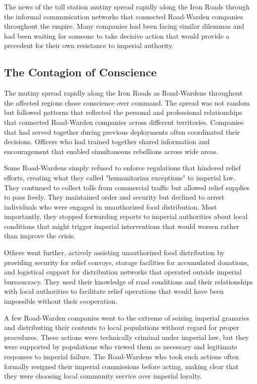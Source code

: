 The news of the toll station mutiny spread rapidly along the Iron Roads
through the informal communication networks that connected Road-Warden
companies throughout the empire. Many companies had been facing similar
dilemmas and had been waiting for someone to take decisive action that
would provide a precedent for their own resistance to imperial
authority.

\subsection{The Contagion of
Conscience}\label{the-contagion-of-conscience}

The mutiny spread rapidly along the Iron Roads as Road-Wardens
throughout the affected regions chose conscience over command. The
spread was not random but followed patterns that reflected the personal
and professional relationships that connected Road-Warden companies
across different territories. Companies that had served together during
previous deployments often coordinated their decisions. Officers who had
trained together shared information and encouragement that enabled
simultaneous rebellions across wide areas.

Some Road-Wardens simply refused to enforce regulations that hindered
relief efforts, creating what they called "humanitarian exceptions" to
imperial law. They continued to collect tolls from commercial traffic
but allowed relief supplies to pass freely. They maintained order and
security but declined to arrest individuals who were engaged in
unauthorized food distribution. Most importantly, they stopped
forwarding reports to imperial authorities about local conditions that
might trigger imperial interventions that would worsen rather than
improve the crisis.

Others went further, actively assisting unauthorized food distribution
by providing security for relief convoys, storage facilities for
accumulated donations, and logistical support for distribution networks
that operated outside imperial bureaucracy. They used their knowledge of
road conditions and their relationships with local authorities to
facilitate relief operations that would have been impossible without
their cooperation.

A few Road-Warden companies went to the extreme of seizing imperial
granaries and distributing their contents to local populations without
regard for proper procedures. These actions were technically criminal
under imperial law, but they were supported by populations who viewed
them as necessary and legitimate responses to imperial failure. The
Road-Wardens who took such actions often formally resigned their
imperial commissions before acting, making clear that they were choosing
local community service over imperial loyalty.

